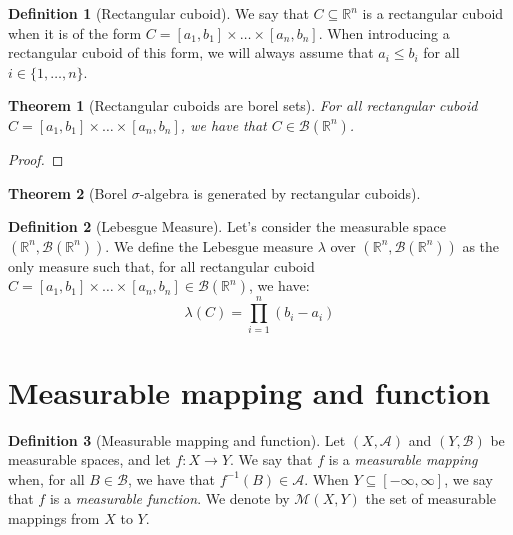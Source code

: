 \documentclass{article}
\newtheorem{theorem}{Theorem}[section]
\theoremstyle{definition}
\newtheorem{definition}{Definition}[section]
\theoremstyle{remark}
\theoremstyle{example}
\theoremstyle{notation}
\theoremstyle{axiom}
\begin{document}
\begin{definition}[Rectangular cuboid]
	We say that $C \subseteq \mathbb{R}^n$ is a rectangular cuboid when it is of the form $C = [a_1, b_1] \times \dots \times [a_n, b_n]$. When introducing a rectangular cuboid of this form, we will always assume that $a_i \leq b_i$ for all $i \in \{1, \dots, n\}$.
\end{definition}

\begin{theorem}[Rectangular cuboids are borel sets]
	For all rectangular cuboid $C = [a_1, b_1] \times \dots \times [a_n, b_n]$, we have that $C \in \mathcal{B}(\mathbb{R}^n)$.
\end{theorem}

\begin{proof}
\end{proof}

\begin{theorem}[Borel $\sigma$-algebra is generated by rectangular cuboids]
\end{theorem}

\begin{definition}[Lebesgue Measure]
    Let's consider the measurable space $(\mathbb{R}^n, \mathcal{B}(\mathbb{R}^n))$. We define the Lebesgue measure $\lambda$ over $(\mathbb{R}^n, \mathcal{B}(\mathbb{R}^n))$ as the only measure such that, for all rectangular cuboid $C = [a_1, b_1] \times \dots \times [a_n, b_n] \in \mathcal{B}(\mathbb{R}^n)$, we have:
        $$\lambda(C) = \prod_{i=1}^n (b_i - a_i)$$
\end{definition}

\section{Measurable mapping and function}

\begin{definition}[Measurable mapping and function]
		Let $(X, \mathcal{A})$ and $(Y, \mathcal{B})$ be measurable spaces, and let $f : X \rightarrow Y$. We say that $f$ is a \textit{measurable mapping} when, for all $B \in \mathcal{B}$, we have that $f^{-1}(B) \in \mathcal{A}$. When $Y \subseteq [-\infty, \infty]$, we say that $f$ is a \textit{measurable function}. We denote by $\mathcal{M}(X, Y)$ the set of measurable mappings from $X$ to $Y$.
\end{definition}
\end{document}
